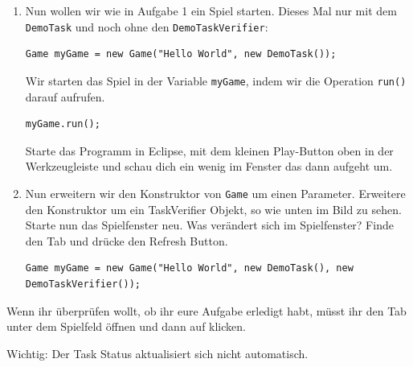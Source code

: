

\begin{enumerate}
    \item Nun wollen wir wie in Aufgabe 1 ein Spiel starten. 
        Dieses Mal nur mit dem \lstinline{DemoTask} und noch ohne den \lstinline{DemoTaskVerifier}:

    \begin{lstlisting}
Game myGame = new Game("Hello World", new DemoTask());
    \end{lstlisting}

    Wir starten das Spiel in der Variable \lstinline{myGame}, indem wir die Operation \lstinline{run()} darauf aufrufen.

    \begin{lstlisting}
myGame.run();
    \end{lstlisting}

    Starte das Programm in Eclipse, mit dem kleinen Play-Button oben in der Werkzeugleiste und schau dich ein wenig im Fenster das dann aufgeht um.

    \item Nun erweitern wir den Konstruktor von \texttt{Game} um einen Parameter. 
        Erweitere den Konstruktor um ein TaskVerifier Objekt, so wie unten im Bild zu sehen. 
        Starte nun das Spielfenster neu. 
        Was verändert sich im Spielfenster? 
        Finde den  Tab und drücke den Refresh Button.

    \begin{lstlisting}
Game myGame = new Game("Hello World", new DemoTask(), new DemoTaskVerifier());
    \end{lstlisting}

\end{enumerate}


\begin{Infobox}
    Wenn ihr überprüfen wollt, ob ihr eure Aufgabe erledigt habt, müsst ihr den  Tab unter dem Spielfeld öffnen und dann auf  klicken.

    Wichtig: Der Task Status aktualisiert sich nicht automatisch.
\end{Infobox}


